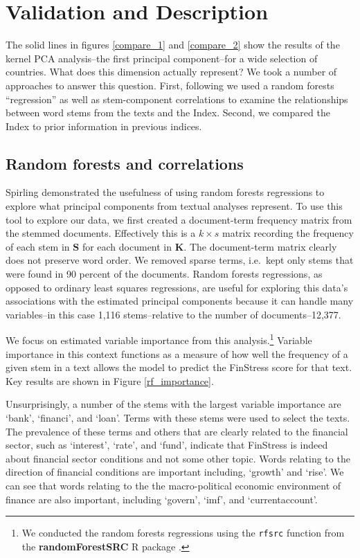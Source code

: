 \documentclass[]{article}
\begin{document}
\section{Validation and Description}\label{results}

The solid lines in figures \ref{compare_1} and \ref{compare_2} show the results of the kernel PCA analysis--the first principal component--for a wide selection of countries. What does this dimension actually represent? We took a number of approaches to answer this question. First, following \cite{Spirling2012} we used a random forests ``regression'' \citep{Breiman2001,jones2015} as well as stem-component correlations to examine the relationships between word stems from the texts and the Index. Second, we compared the Index to prior information in previous indices.

\subsection{Random forests and correlations}\label{random-forests}

Spirling \citeyearpar[88-90]{Spirling2012} demonstrated the usefulness of using random forests regressions to explore what principal components from textual analyses represent. To use this tool to explore our data, we first created a document-term frequency matrix from the stemmed documents. Effectively this is a \(k \times s\) matrix recording the frequency of each stem in \(\bm{S}\) for each document in \(\bm{K}\). The document-term matrix clearly does not preserve word order. We removed sparse terms, i.e.~kept only stems that were found in 90 percent of the documents. Random forests regressions, as opposed to ordinary least squares regressions, are useful for exploring this data's associations with the estimated principal components because it can handle many variables--in this case 1,116 stems--relative to the number of documents--12,377.

We focus on estimated variable importance from this analysis.\footnote{We conducted the random forests regressions using the \texttt{rfsrc} function from the \textbf{randomForestSRC} R package \citep{randomForestSRCCite}.} Variable importance in this context functions as a measure of how well the frequency of a given stem in a text allows the model to predict the FinStress score for that text. Key results are shown in Figure \ref{rf_importance}.

Unsurprisingly, a number of the stems with the largest variable importance are `bank', `financi', and `loan'. Terms with these stems were used to select the texts. The prevalence of these terms and others that are clearly related to the financial sector, such as `interest', `rate', and `fund', indicate that FinStress is indeed about financial sector conditions and not some other topic. Words relating to the direction of financial conditions are important including, `growth' and `rise'. We can see that words relating to the the macro-political economic environment of finance are also important, including `govern', `imf', and `currentaccount'.
\end{document}
